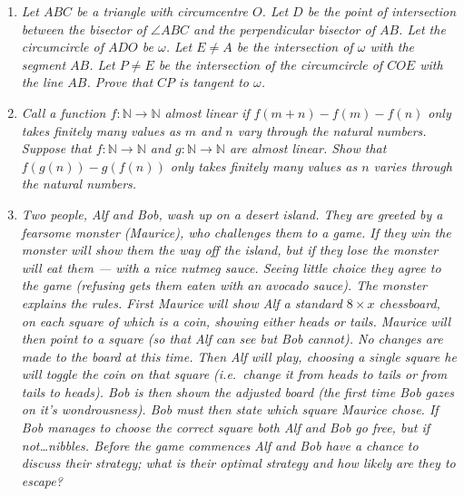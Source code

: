 \documentclass{article}
\begin{document}
\begin{enumerate}[1.]
\vspace{6pt}
\item %
{\itshape Let $ABC$ be a triangle with circumcentre $O$. Let $D$ be the point of intersection between the bisector of $\angle ABC$ and the perpendicular bisector of $AB$. Let the circumcircle of $ADO$ be $\omega$. Let $E\neq A$ be the intersection of $\omega$ with the segment $AB$. Let $P\neq E$ be the intersection of the circumcircle of $COE$ with the line $AB$. Prove that $CP$ is tangent to $\omega$.}


\vspace{6pt}
\item %
{\itshape Call a function $f : \mathbb{N} \to \mathbb{N}$ \emph{almost linear} if $f(m + n) - f(m) - f(n)$ only takes finitely many values as $m$ and $n$ vary through the natural numbers. Suppose that $f : \mathbb{N} \to \mathbb{N}$ and $g : \mathbb{N} \to \mathbb{N}$ are almost linear. Show that $f(g(n)) - g(f(n))$ only takes finitely many values as $n$ varies through the natural numbers.}


\vspace{6pt}
\item %
{\itshape Two people, Alf and Bob, wash up on a desert island. They are greeted by a fearsome monster (Maurice), who challenges them to a game. If they win the monster will show them the way off the island, but if they lose the monster will eat them --- with a nice nutmeg sauce. Seeing little choice they agree to the game (refusing gets them eaten with an avocado sauce). The monster explains the rules. First Maurice will show Alf a standard $8 \times x$ chessboard, on each square of which is a coin, showing either heads or tails. Maurice will then point to a square (so that Alf can see but Bob cannot). No changes are made to the board at this time. Then Alf will play, choosing a single square he will toggle the coin on that square (i.e.\ change it from heads to tails or from tails to heads). Bob is then shown the adjusted board (the first time Bob gazes on it's wondrousness). Bob must then state which square Maurice chose. If Bob manages to choose the correct square both Alf and Bob go free, but if not\dots nibbles. Before the game commences Alf and Bob have a chance to discuss their strategy; what is their optimal strategy and how likely are they to escape?}


\end{enumerate}
\end{document}
